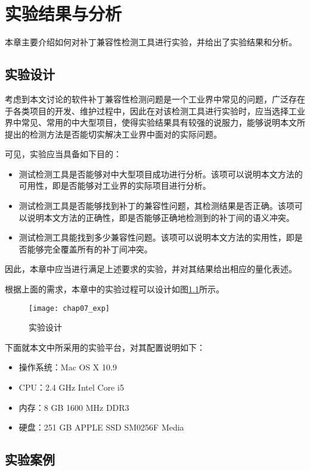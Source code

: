 \chapter{实验结果与分析}
\label {exp}
本章主要介绍如何对补丁兼容性检测工具进行实验，并给出了实验结果和分析。

\section{实验设计}
\label {exp_des}

考虑到本文讨论的软件补丁兼容性检测问题是一个工业界中常见的问题，广泛存在于各类项目的开发、维护过程中，因此在对该检测工具进行实验时，应当选择工业界中常见、常用的中大型项目，使得实验结果具有较强的说服力，能够说明本文所提出的检测方法是否能切实解决工业界中面对的实际问题。

可见，实验应当具备如下目的：
\begin{itemize}
	\item 测试检测工具是否能够对中大型项目成功进行分析。该项可以说明本文方法的可用性，即是否能够对工业界的实际项目进行分析。
	\item 测试检测工具是否能够找到补丁的兼容性问题，其检测结果是否正确。该项可以说明本文方法的正确性，即是否能够正确地检测到的补丁间的语义冲突。
	\item 测试检测工具能找到多少兼容性问题。该项可以说明本文方法的实用性，即是否能够完全覆盖所有的补丁间冲突。
\end{itemize}

因此，本章中应当进行满足上述要求的实验，并对其结果给出相应的量化表述。

根据上面的需求，本章中的实验过程可以设计如图\ref {des_exp}所示。

\begin{figure}[H]
	\centering
	\texttt{[image: chap07\_exp]}
	\caption {实验设计}
	\label {des_exp}	
\end{figure}


下面就本文中所采用的实验平台，对其配置说明如下：
\begin{itemize}
	\item 操作系统：Mac OS X 10.9
	\item CPU：2.4 GHz Intel Core i5
	\item 内存：8 GB 1600 MHz DDR3
	\item 硬盘：251 GB APPLE SSD SM0256F Media
\end{itemize}

\section{实验案例}
\label {exp_data}

